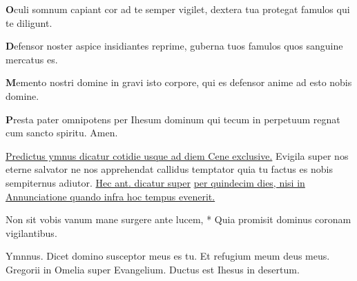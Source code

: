 \begin{multicols*}{2}
{\par {\bfseries \color{Red} O}culi somnum capiant
cor ad te semper vigilet,
dextera tua protegat
famulos qui te diligunt.
\par {\bfseries \color{Blue} D}efensor noster aspice
insidiantes reprime,
guberna tuos famulos
quos sanguine mercatus es.
\par {\bfseries \color{Red} M}emento nostri domine
in gravi isto corpore,
qui es defensor anime
ad esto nobis domine.
\par {\bfseries \color{Blue} P}resta pater omnipotens
per Ihesum dominum
qui tecum in perpetuum
regnat cum sancto spiritu. Amen.
}
\newline \ul{Predictus ymnus dicatur cotidie usque ad diem Cene exclusive.}
 Evigila super nos eterne salvator ne nos apprehendat callidus temptator quia tu factus es nobis sempiternus adiutor.
\newline \ul{Hec ant. dicatur super}  \ul{per quindecim dies, nisi in Annunciatione quando infra hoc tempus evenerit.}
\begin{invitatory}
{Non sit vobis vanum mane surgere ante lucem, * Quia promisit dominus coronam vigilantibus.}
\end{invitatory}
{\color{Red} Ymnnus.}
 \V Dicet domino susceptor meus es tu. \R Et refugium meum deus meus. {\color{Red} Gregorii in Omelia super Evangelium.} Ductus est Ihesus in desertum.

\end{multicols*}
